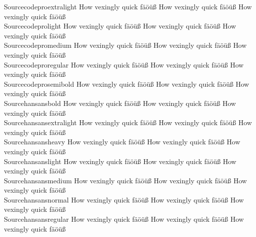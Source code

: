 \begin{tabbing}
Sourcecodeproextralight \> {\mktsStyleNormal{}How vexingly quick fäöüß} {\mktsFontfileSourcecodeproextralight{}How vexingly quick fäöüß} {\mktsStyleItalic{}How vexingly quick fäöüß} \\
Sourcecodeprolight \> {\mktsStyleNormal{}How vexingly quick fäöüß} {\mktsFontfileSourcecodeprolight{}How vexingly quick fäöüß} {\mktsStyleItalic{}How vexingly quick fäöüß} \\
Sourcecodepromedium \> {\mktsStyleNormal{}How vexingly quick fäöüß} {\mktsFontfileSourcecodepromedium{}How vexingly quick fäöüß} {\mktsStyleItalic{}How vexingly quick fäöüß} \\
Sourcecodeproregular \> {\mktsStyleNormal{}How vexingly quick fäöüß} {\mktsFontfileSourcecodeproregular{}How vexingly quick fäöüß} {\mktsStyleItalic{}How vexingly quick fäöüß} \\
Sourcecodeprosemibold \> {\mktsStyleNormal{}How vexingly quick fäöüß} {\mktsFontfileSourcecodeprosemibold{}How vexingly quick fäöüß} {\mktsStyleItalic{}How vexingly quick fäöüß} \\
Sourcehansansbold \> {\mktsStyleNormal{}How vexingly quick fäöüß} {\mktsFontfileSourcehansansbold{}How vexingly quick fäöüß} {\mktsStyleItalic{}How vexingly quick fäöüß} \\
Sourcehansansextralight \> {\mktsStyleNormal{}How vexingly quick fäöüß} {\mktsFontfileSourcehansansextralight{}How vexingly quick fäöüß} {\mktsStyleItalic{}How vexingly quick fäöüß} \\
Sourcehansansheavy \> {\mktsStyleNormal{}How vexingly quick fäöüß} {\mktsFontfileSourcehansansheavy{}How vexingly quick fäöüß} {\mktsStyleItalic{}How vexingly quick fäöüß} \\
Sourcehansanslight \> {\mktsStyleNormal{}How vexingly quick fäöüß} {\mktsFontfileSourcehansanslight{}How vexingly quick fäöüß} {\mktsStyleItalic{}How vexingly quick fäöüß} \\
Sourcehansansmedium \> {\mktsStyleNormal{}How vexingly quick fäöüß} {\mktsFontfileSourcehansansmedium{}How vexingly quick fäöüß} {\mktsStyleItalic{}How vexingly quick fäöüß} \\
Sourcehansansnormal \> {\mktsStyleNormal{}How vexingly quick fäöüß} {\mktsFontfileSourcehansansnormal{}How vexingly quick fäöüß} {\mktsStyleItalic{}How vexingly quick fäöüß} \\
Sourcehansansregular \> {\mktsStyleNormal{}How vexingly quick fäöüß} {\mktsFontfileSourcehansansregular{}How vexingly quick fäöüß} {\mktsStyleItalic{}How vexingly quick fäöüß} \\

\end{tabbing}
